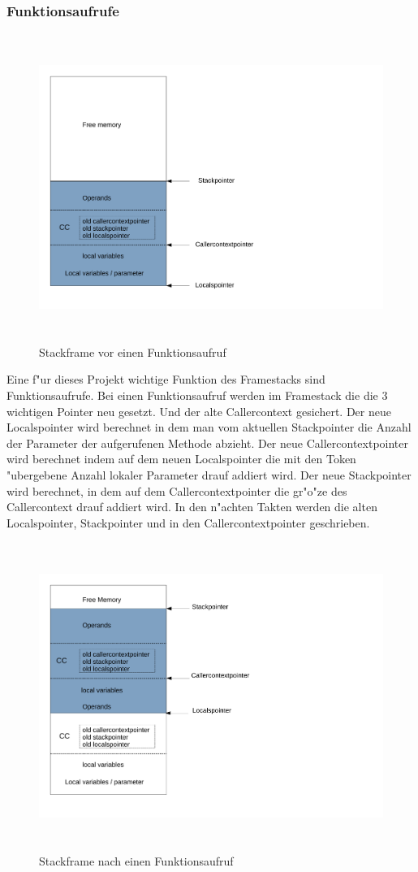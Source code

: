 \subsubsection{Funktionsaufrufe}
\begin{figure}
	\centering
	\includegraphics[height = 10cm]{PS_RS_graphics/StackframebeforeInvoke.pdf}
	\caption{Stackframe vor einen Funktionsaufruf}
\end{figure}
Eine f"ur dieses Projekt wichtige Funktion des Framestacks sind Funktionsaufrufe. Bei einen Funktionsaufruf werden im Framestack die die 3 wichtigen Pointer neu gesetzt. Und der alte Callercontext gesichert. Der neue Localspointer wird berechnet in dem man vom aktuellen Stackpointer die Anzahl der Parameter der aufgerufenen Methode abzieht. Der neue Callercontextpointer wird berechnet indem auf dem neuen Localspointer die mit den Token "ubergebene Anzahl lokaler Parameter drauf addiert wird. Der neue Stackpointer wird berechnet, in dem auf dem Callercontextpointer die gr"o"ze des Callercontext drauf addiert wird. 
In den n"achten Takten werden die alten Localspointer, Stackpointer und in den Callercontextpointer geschrieben. \cite{Illy}
\begin{figure}
	\centering
	\includegraphics[height = 10cm]{PS_RS_graphics/StackframeafterInvoke.pdf}
	\caption{Stackframe nach einen Funktionsaufruf}
\end{figure}


